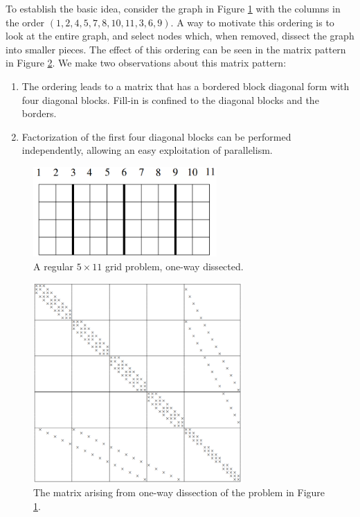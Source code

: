 \begin{exm}
  To establish the basic idea, consider the graph in Figure
  \ref{fig:onewayDissectionCase} with the
  columns in the order $(1,2,4,5,7,8,10,11,3,6,9).$ A way to motivate
  this ordering is to look at the entire graph, and select nodes
  which, when removed, dissect the graph into smaller pieces. The
  effect of this ordering can be seen in the matrix pattern in
  Figure \ref{fig:onewayDissectionCaseMatrix}. We make two observations about this matrix pattern:
  \begin{enumerate}
  \item The ordering leads to a matrix that has a bordered block diagonal
form with four diagonal blocks. Fill-in is confined to the diagonal
blocks and the borders.
\item Factorization of the first four diagonal blocks can be performed independently,
allowing an easy exploitation of parallelism.
\end{enumerate}

\begin{figure}[H]
  \centering
  \includegraphics[width=7cm]{png/onewayDissectionCase.png}
  \caption{A regular $5\times 11$ grid problem, one-way dissected.}
  \label{fig:onewayDissectionCase}
\end{figure}
\begin{figure}[H]
  \centering
  \includegraphics[width=8cm]{png/onewayDissectionMatrix.png}
  \caption{The matrix arising from one-way dissection of the problem
    in Figure \ref{fig:onewayDissectionCase}.}
  \label{fig:onewayDissectionCaseMatrix}
\end{figure}
\end{exm}

